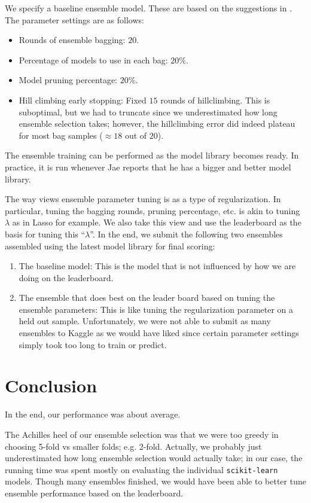 \documentclass{article}
\renewcommand{\(}{\left(}
\renewcommand{\)}{\right)}
\begin{document}
We specify a baseline ensemble model. These are based on the suggestions in \cite{caruana06}. The parameter settings are as follows:
\begin{itemize}
  \item Rounds of ensemble bagging: $20$.
  \item Percentage of models to use in each bag: $20\%$.
  \item Model pruning percentage: $20\%$. 
  \item Hill climbing early stopping: Fixed $15$ rounds of hillclimbing. This is suboptimal, but we had to truncate since we underestimated how long ensemble selection takes; however, the hillclimbing error did indeed plateau for most bag samples ($\approx 18$ out of $20$).
\end{itemize}
The ensemble training can be performed as the model library becomes ready. In practice, it is run whenever Jae reports that he has a bigger and better model library.

The way \cite{caruana04} views ensemble parameter tuning is as a type of regularization. In particular, tuning the bagging rounds, pruning percentage, etc. is akin to tuning $\lambda$ as in Lasso for example. We also take this view and use the leaderboard as the basis for tuning this ``$\lambda$''. In the end, we submit the following two ensembles assembled using the latest model library for final scoring:
\begin{enumerate}
  \item The baseline model: This is the model that is not influenced by how we are doing on the leaderboard. 
  \item The ensemble that does best on the leader board based on tuning the ensemble parameters: This is like tuning the regularization parameter on a held out sample. Unfortunately, we were not able to submit as many ensembles to Kaggle as we would have liked since certain parameter settings simply took too long to train or predict. 
\end{enumerate}


\section{Conclusion}
In the end, our performance was about average. 

The Achilles heel of our ensemble selection was that we were too greedy in choosing 5-fold vs smaller folds; e.g. 2-fold. Actually, we probably just underestimated how long ensemble selection would actually take; in our case, the running time was spent mostly on evaluating the individual \texttt{scikit-learn} models. Though many ensembles finished, we would have been able to better tune ensemble performance based on the leaderboard. 
\end{document}
